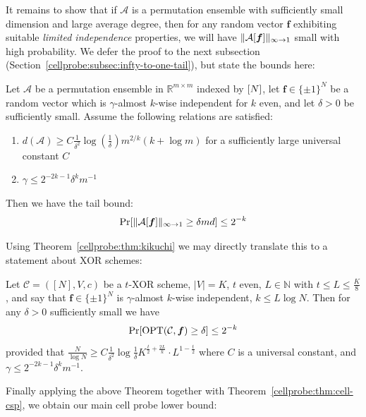 It remains to show that if $\mathcal{A}$ is a permutation ensemble with sufficiently small dimension and large average degree, then for any random vector $\bm{f}$ exhibiting suitable \emph{limited independence} properties, we will have $\Vert \mathcal{A}[\bm{f}] \Vert_{\infty \to 1}$ small with high probability. We defer the proof to the next subsection (Section~\ref{cellprobe:subsec:infty-to-one-tail}), but state the bounds here:
\begin{theorem}\label{cellprobe:thm:infty-one-tail-bound}
Let $\mathcal{A}$ be a permutation ensemble in $\mathbb{R}^{m \times m}$ indexed by $[N]$, let $\bm{f} \in \{\pm 1\}^N$ be a random vector which is $\gamma$-almost $k$-wise independent for $k$ even, and let $\delta > 0$ be sufficiently small. Assume the following relations are satisfied:
\begin{enumerate}
	\item $d(\mathcal{A})\geq   C\frac{1}{\delta^2} \log(\frac{1}{\delta}) m^{2/k}(k+\log m )$ for a sufficiently large universal constant $C$
	\item $\gamma \leq 2^{-2k-1}\delta^km^{-1}$ 
\end{enumerate}
Then we have the tail bound:
\[
\Pr[\Vert \mathcal{A}[\bm{f}] \Vert_{\infty \to 1} \geq \delta m d] \leq 2^{-k}
\]
\end{theorem}
Using Theorem~\ref{cellprobe:thm:kikuchi} we may directly translate this to a statement about XOR schemes: 
\begin{theorem}\label{cellprobe:thm:k-wise-csp}
Let $\mathcal{C} = ([N],V,c)$ be a $t$-XOR scheme, $|V|=K$, $t$ even, $L \in \mathbb{N}$ with $t \leq L \leq \frac{K}{8}$, and say that $\bm{f}\in \{\pm 1\}^N$ is $\gamma$-almost $k$-wise independent, $k \leq L \log N$. Then for any $\delta >0$ sufficiently small we have
\[
\Pr[\mathrm{OPT}(\mathcal{C},\bm{f}) \geq \delta ] \leq 2^{-k}
\]
provided that $\frac{N}{\log N} \geq C \frac{1}{\delta^2} \log \frac{1}{\delta} K^{\frac{t}{2} + \frac{2L}{k}}\cdot  L^{1 - \frac{t}{2}}$ where $C$ is a universal constant, and $\gamma \leq 2^{-2k - 1} \delta^k m^{-1}$.
\end{theorem}

Finally applying the above Theorem together with Theorem~\ref{cellprobe:thm:cell-csp}, we obtain our main cell probe lower bound:



